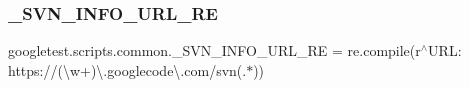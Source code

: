 \subsubsection{\texorpdfstring{\_SVN\_INFO\_URL\_RE}{\_SVN\_INFO\_URL\_RE}}
{\footnotesize\ttfamily googletest.\+scripts.\+common.\+\_\+\+S\+V\+N\+\_\+\+I\+N\+F\+O\+\_\+\+U\+R\+L\+\_\+\+RE = re.\+compile(r\textquotesingle{}$^\wedge$U\+R\+L\+: https\+://(\textbackslash{}w+)\textbackslash{}.googlecode\textbackslash{}.\+com/svn(.$\ast$)\textquotesingle{})\hspace{0.3cm}{\ttfamily [private]}}


